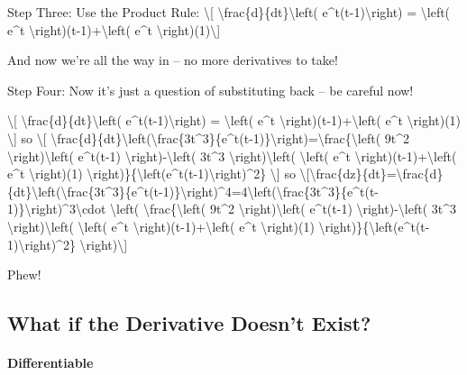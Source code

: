Step Three: Use the Product Rule: \textbackslash{}{[}
\textbackslash{}frac\{d\}\{dt\}\textbackslash{}left(
e\^{}t(t-1)\textbackslash{}right) = \textbackslash{}left( e\^{}t
\textbackslash{}right)(t-1)+\textbackslash{}left( e\^{}t
\textbackslash{}right)(1)\textbackslash{}{]}

And now we're all the way in -- no more derivatives to take!

Step Four: Now it's just a question of substituting back -- be careful
now!

\textbackslash{}{[} \textbackslash{}frac\{d\}\{dt\}\textbackslash{}left(
e\^{}t(t-1)\textbackslash{}right) = \textbackslash{}left( e\^{}t
\textbackslash{}right)(t-1)+\textbackslash{}left( e\^{}t
\textbackslash{}right)(1) \textbackslash{}{]} so \textbackslash{}{[}
\textbackslash{}frac\{d\}\{dt\}\textbackslash{}left(\textbackslash{}frac\{3t\^{}3\}\{e\^{}t(t-1)\}\textbackslash{}right)=\textbackslash{}frac\{\textbackslash{}left(
9t\^{}2 \textbackslash{}right)\textbackslash{}left( e\^{}t(t-1)
\textbackslash{}right)-\textbackslash{}left( 3t\^{}3
\textbackslash{}right)\textbackslash{}left( \textbackslash{}left( e\^{}t
\textbackslash{}right)(t-1)+\textbackslash{}left( e\^{}t
\textbackslash{}right)(1)
\textbackslash{}right)\}\{\textbackslash{}left(e\^{}t(t-1)\textbackslash{}right)\^{}2\}
\textbackslash{}{]} so
\textbackslash{}{[}\textbackslash{}frac\{dz\}\{dt\}=\textbackslash{}frac\{d\}\{dt\}\textbackslash{}left(\textbackslash{}frac\{3t\^{}3\}\{e\^{}t(t-1)\}\textbackslash{}right)\^{}4=4\textbackslash{}left(\textbackslash{}frac\{3t\^{}3\}\{e\^{}t(t-1)\}\textbackslash{}right)\^{}3\textbackslash{}cdot
\textbackslash{}left( \textbackslash{}frac\{\textbackslash{}left(
9t\^{}2 \textbackslash{}right)\textbackslash{}left( e\^{}t(t-1)
\textbackslash{}right)-\textbackslash{}left( 3t\^{}3
\textbackslash{}right)\textbackslash{}left( \textbackslash{}left( e\^{}t
\textbackslash{}right)(t-1)+\textbackslash{}left( e\^{}t
\textbackslash{}right)(1)
\textbackslash{}right)\}\{\textbackslash{}left(e\^{}t(t-1)\textbackslash{}right)\^{}2\}
\textbackslash{}right)\textbackslash{}{]}

Phew!

\hypertarget{what-if-the-derivative-doesnt-exist}{%
\subsection{What if the Derivative Doesn't
Exist?}\label{what-if-the-derivative-doesnt-exist}}

\hypertarget{differentiable}{%
\paragraph{Differentiable}\label{differentiable}}

